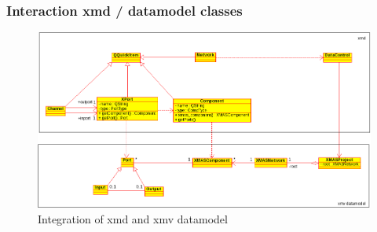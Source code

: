 \subsubsection{Interaction xmd / datamodel classes}

\begin{figure}
    \includegraphics[width=\textwidth]{xmd-xmv-integration}
    \caption{Integration of xmd and xmv datamodel}
\end{figure}
